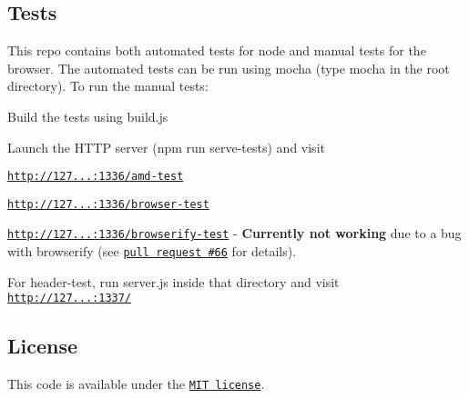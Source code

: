 \subsection*{Tests}

This repo contains both automated tests for node and manual tests for the browser. The automated tests can be run using mocha (type {\ttfamily mocha} in the root directory). To run the manual tests\+:


\begin{DoxyItemize}
\item Build the tests using {\ttfamily build.\+js}
\item Launch the H\+T\+TP server ({\ttfamily npm run serve-\/tests}) and visit
\begin{DoxyItemize}
\item \href{http://127.0.0.1:1336/amd-test}{\tt http\+://127...\+:1336/amd-\/test}
\item \href{http://127.0.0.1:1336/browser-test}{\tt http\+://127...\+:1336/browser-\/test}
\item \href{http://127.0.0.1:1336/browserify-test}{\tt http\+://127...\+:1336/browserify-\/test} -\/ {\bfseries Currently not working} due to a bug with browserify (see \href{https://github.com/evanw/node-source-map-support/pull/66}{\tt pull request \#66} for details).
\end{DoxyItemize}
\item For {\ttfamily header-\/test}, run {\ttfamily server.\+js} inside that directory and visit \href{http://127.0.0.1:1337/}{\tt http\+://127...\+:1337/}
\end{DoxyItemize}

\subsection*{License}

This code is available under the \href{http://opensource.org/licenses/MIT}{\tt M\+IT license}. 